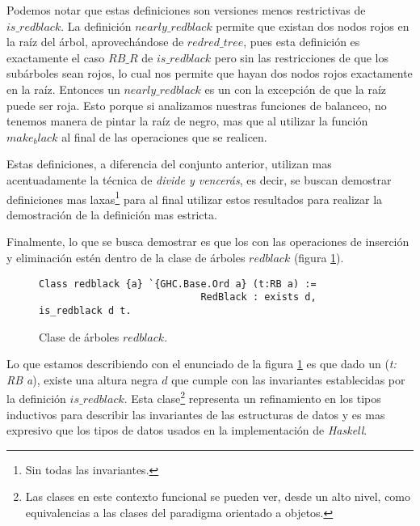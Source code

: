 Podemos notar que estas definiciones son versiones menos restrictivas de $is\_redblack$. La
definici\'on $nearly\_redblack$ permite que existan dos nodos rojos en la ra\'iz del \'arbol,
aprovech\'andose de $redred\_tree$, pues esta definici\'on es exactamente el caso $RB\_R$ de
$is\_redblack$ pero sin las restricciones de que los sub\'arboles sean rojos, lo cual nos permite
que hayan dos nodos rojos exactamente en la ra\'iz. Entonces un $nearly\_redblack$ es un {\arn} con
la excepci\'on de que la ra\'iz puede ser roja. Esto porque si analizamos nuestras funciones de balanceo, no tenemos manera de pintar la raíz de negro, mas que al utilizar la función $make_black$ al final de las operaciones que se realicen. 

Estas definiciones, a diferencia del conjunto anterior, utilizan mas acentuadamente la t\'ecnica de \textit{divide y vencerás}, es decir, se buscan demostrar definiciones mas laxas\footnote{Sin todas las invariantes.} para al final utilizar estos resultados para realizar la demostraci\'on de la definición mas estricta.

Finalmente, lo que se busca demostrar es que los {\arns} con las operaciones de inserci\'on y
eliminaci\'on est\'en dentro de la clase de \'arboles $redblack$ (figura \ref{class_rb}).

\begin{figure}[!ht]
\centering
\captionsetup{justification=centering}
\begin{verbatim}
Class redblack {a} `{GHC.Base.Ord a} (t:RB a) :=
                            RedBlack : exists d, is_redblack d t.
\end{verbatim}
\caption{Clase de \'arboles $redblack$.}
\label{class_rb}
\end{figure}

Lo que estamos describiendo con el enunciado de la figura \ref{class_rb} es que dado un {\arn} (\textit{t: RB a}), existe una altura
negra $d$ que cumple con las invariantes establecidas por la definici\'on $is\_redblack$. Esta clase\footnote{Las clases en este contexto funcional se pueden ver, desde un alto nivel, como equivalencias a las clases del paradigma orientado a objetos.} representa un refinamiento en los tipos inductivos para describir las invariantes de las estructuras de datos y es mas expresivo que los tipos de datos usados en la implementaci\'on de \textit{Haskell}.

